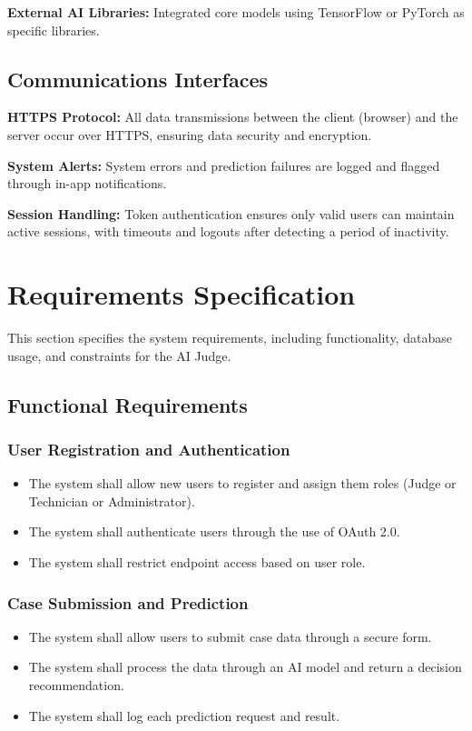 \documentclass[12pt]{article}
\begin{document}
\textbf{External AI Libraries:} Integrated core models using TensorFlow or PyTorch as specific libraries.

\subsection{Communications Interfaces}

\textbf{HTTPS Protocol:} All data transmissions between the client (browser) and the server occur over HTTPS, ensuring data security and encryption.

\textbf{System Alerts:} System errors and prediction failures are logged and flagged through in-app notifications.

\textbf{Session Handling:} Token authentication ensures only valid users can maintain active sessions, with timeouts and logouts after detecting a period of inactivity.

\section{Requirements Specification}

This section specifies the system requirements, including functionality, database usage, and constraints for the AI Judge.

\subsection{Functional Requirements}

\subsubsection{User Registration and Authentication}
\begin{itemize}
    \item The system shall allow new users to register and assign them roles (Judge or Technician or Administrator).
    \item The system shall authenticate users through the use of OAuth 2.0.
    \item The system shall restrict endpoint access based on user role.
\end{itemize}

\subsubsection{Case Submission and Prediction}
\begin{itemize}
    \item The system shall allow users to submit case data through a secure form.
    \item The system shall process the data through an AI model and return a decision recommendation.
    \item The system shall log each prediction request and result.
\end{itemize}
\end{document}
